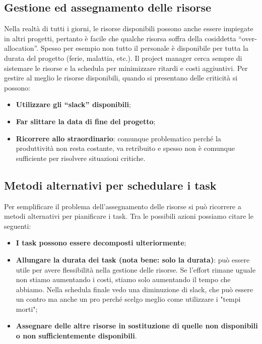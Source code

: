 \subsection{Gestione ed assegnamento delle risorse}
Nella realtà di tutti i giorni, le risorse disponibili possono anche essere impiegate in altri progetti, pertanto è facile che qualche risorsa soffra della cosiddetta “over-allocation”.
Spesso per esempio non tutto il personale è disponibile per tutta la durata del progetto (ferie, malattia, etc.).
Il project manager cerca sempre di sistemare le risorse e la schedula per minimizzare ritardi e costi aggiuntivi.
Per gestire al meglio le risorse disponibili, quando si presentano delle criticità si possono:
\begin{itemize}
	\item \textbf{Utilizzare gli “slack” disponibili};
	\item \textbf{Far slittare la data di fine del progetto};
	\item \textbf{Ricorrere allo straordinario}: comunque problematico perché la produttività non resta costante, va retribuito e spesso non è comunque sufficiente per risolvere situazioni critiche.
\end{itemize}

\subsection{Metodi alternativi per schedulare i task}
Per semplificare il problema dell’assegnamento delle risorse si può ricorrere a metodi alternativi per pianificare i task. Tra le possibili azioni possiamo citare le seguenti:
\begin{itemize}
	\item \textbf{I task possono essere decomposti ulteriormente};
	\item \textbf{Allungare la durata dei task (nota bene: solo la durata)}: può essere utile per avere flessibilità nella gestione delle risorse. Se l'effort rimane uguale non stiamo aumentando i costi, stiamo solo aumentando il tempo che abbiamo. Nella schedula finale vedo una diminuzione di slack, che può essere un contro ma anche un pro perché scelgo meglio come utilizzare i "tempi morti";
	\item \textbf{Assegnare delle altre risorse in sostituzione di quelle non disponibili o non sufficientemente disponibili}.
\end{itemize}

